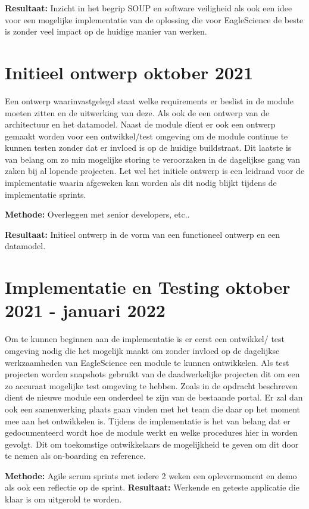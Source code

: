 \textbf{Resultaat:} Inzicht in het begrip SOUP en software veiligheid als ook een idee voor een mogelijke implementatie van de oplossing die voor EagleScience de beste is zonder veel impact op de huidige manier van werken.
\section{Initieel ontwerp \textbf{oktober 2021 }}\label{sec:initieel-ontwerp}
Een ontwerp waarinvastgelegd staat welke requirements er beslist in de module moeten zitten en de uitwerking van deze. Als ook de een ontwerp van de architectuur en het datamodel. Naast de module dient er ook een ontwerp gemaakt worden voor een ontwikkel/test omgeving om de module continue te kunnen testen zonder dat er invloed is op de huidige buildstraat. Dit laatste is van belang om zo min mogelijke storing te veroorzaken in de dagelijkse gang van zaken bij al lopende projecten. Let wel het initiele ontwerp is een leidraad voor de implementatie waarin afgeweken kan worden als dit nodig blijkt tijdens de implementatie sprints.

\textbf{Methode:} Overleggen met senior developers, etc..

\textbf{Resultaat:} Initieel ontwerp in de vorm van een functioneel ontwerp en een datamodel.

\section{Implementatie en Testing \textbf{oktober 2021 - januari 2022 }}\label{sec:implementatie-en-testing}
Om te kunnen beginnen aan de implementatie is er eerst een ontwikkel/ test omgeving nodig die het mogelijk maakt om zonder invloed op de dagelijkse werkzaamheden van EagleScience een module te kunnen ontwikkelen. Als test projecten worden snapshots gebruikt van de daadwerkelijke projecten dit om een zo accuraat mogelijke test omgeving te hebben. Zoals in de opdracht beschreven dient de nieuwe module een onderdeel te zijn van de bestaande portal. Er zal dan ook een samenwerking plaats gaan vinden met het team die daar op het moment mee aan het ontwikkelen is. Tijdens de implementatie is het van belang dat er gedocumenteerd wordt hoe de module werkt en welke procedures hier in worden gevolgt. Dit om toekomstige ontwikkelaars de mogelijkheid te geven om dit door te nemen als on-boarding en reference.

\textbf{Methode:} Agile scrum sprints met iedere 2 weken een oplevermoment en demo als ook een reflectie op de sprint.
\textbf{Resultaat:} Werkende en geteste applicatie die klaar is om uitgerold te worden.

